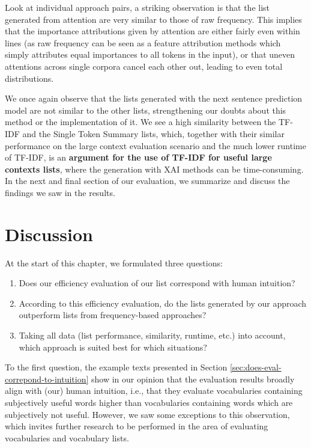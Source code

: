 Look at individual approach pairs, a striking observation is that the list generated from attention are very similar to those of raw frequency.
This implies that the importance attributions given by attention are either fairly even within lines (as raw frequency can be seen as a feature attribution methods which simply attributes equal importances to all tokens in the input), or that uneven attentions across single corpora cancel each other out, leading to even total distributions.

We once again observe that the lists generated with the next sentence prediction model are not similar to the other lists, strengthening our doubts about this method or the implementation of it.
We see a high similarity between the TF-IDF and the Single Token Summary lists, which, together with their similar performance on the large context evaluation scenario and the much lower runtime of TF-IDF, is an \textbf{argument for the use of TF-IDF for useful large contexts lists}, where the generation with XAI methods can be time-consuming.
In the next and final section of our evaluation, we summarize and discuss the findings we saw in the results.


\section{Discussion} \label{sec:results-discussion}
At the start of this chapter, we formulated three questions:


\begin{enumerate}
	\item Does our efficiency evaluation of our list correspond with human intuition?
	\item According to this efficiency evaluation, do the lists generated by our approach outperform lists from frequency-based approaches?
	\item Taking all data (list performance, similarity, runtime, etc.) into account, which approach is suited best for which situations?
\end{enumerate}

To the first question, the example texts presented in Section \ref{sec:does-eval-correpond-to-intuition} show in our opinion that the evaluation results broadly align with (our) human intuition, i.e., that they evaluate vocabularies containing subjectively useful words higher than vocabularies containing words which are subjectively not useful.
However, we saw some exceptions to this observation, which invites further research to be performed in the area of evaluating vocabularies and vocabulary lists.

